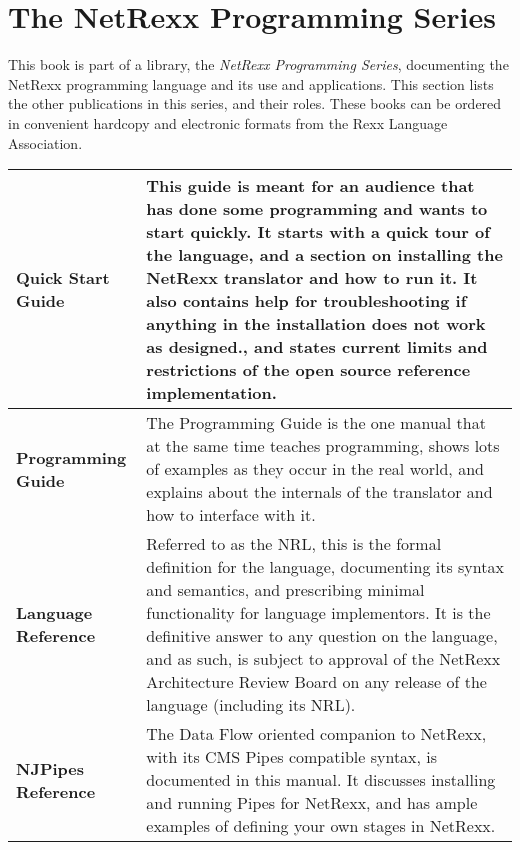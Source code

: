 \chapter{The NetRexx Programming Series}
This book is part of a library, the \emph{NetRexx Programming Series}, documenting the NetRexx programming language and its use and applications. This section lists the other publications in this series, and their roles. These books can be ordered in convenient hardcopy and electronic formats from the Rexx Language Association.
\newline
\newline
\newline
\begin{tabularx}{\textwidth}{>{\bfseries}lX}
\toprule
Quick Start Guide & This guide is meant for an audience that has done some programming and wants to start quickly. It starts with a quick tour of the language, and a section on installing the NetRexx translator and how to run it. It also contains help for troubleshooting if anything in the installation does not work as designed., and states current limits and restrictions of the open source reference implementation.
\\\midrule
Programming Guide & The Programming Guide is the one manual that at the same time teaches programming, shows lots of examples as they occur in the real world, and explains about the internals of the translator and how to interface with it.
\\\midrule
Language Reference & Referred to as the NRL, this is the formal definition for the language, documenting its syntax and semantics, and prescribing minimal functionality for language implementors. It is the definitive answer to any question on the language, and as such, is subject to approval of the NetRexx Architecture Review Board on any release of the language (including its NRL).
\\\midrule
NJPipes Reference & The Data Flow oriented companion to NetRexx, with its CMS Pipes compatible syntax, is documented in this manual. It discusses installing and running Pipes for NetRexx, and has ample examples of defining your own stages in NetRexx.
\\\bottomrule
\end{tabularx}
